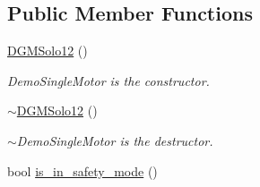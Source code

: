 \subsection*{Public Member Functions}
\begin{DoxyCompactItemize}
\item 
\hyperlink{classdg__blmc__robots_1_1DGMSolo12_af723971f57c6acb3168aa08876e3798e}{D\+G\+M\+Solo12} ()\hypertarget{classdg__blmc__robots_1_1DGMSolo12_af723971f57c6acb3168aa08876e3798e}{}\label{classdg__blmc__robots_1_1DGMSolo12_af723971f57c6acb3168aa08876e3798e}

\begin{DoxyCompactList}\small\item\em Demo\+Single\+Motor is the constructor. \end{DoxyCompactList}\item 
\hyperlink{classdg__blmc__robots_1_1DGMSolo12_a1e3ebce3491c53013e089883393c3338}{$\sim$\+D\+G\+M\+Solo12} ()\hypertarget{classdg__blmc__robots_1_1DGMSolo12_a1e3ebce3491c53013e089883393c3338}{}\label{classdg__blmc__robots_1_1DGMSolo12_a1e3ebce3491c53013e089883393c3338}

\begin{DoxyCompactList}\small\item\em $\sim$\+Demo\+Single\+Motor is the destructor. \end{DoxyCompactList}\item 
bool \hyperlink{classdg__blmc__robots_1_1DGMSolo12_aa6302b840e6e3c86b9fc4d9bf05a21ef}{is\+\_\+in\+\_\+safety\+\_\+mode} ()\hypertarget{classdg__blmc__robots_1_1DGMSolo12_aa6302b840e6e3c86b9fc4d9bf05a21ef}{}\label{classdg__blmc__robots_1_1DGMSolo12_aa6302b840e6e3c86b9fc4d9bf05a21ef}


\end{DoxyCompactItemize}
